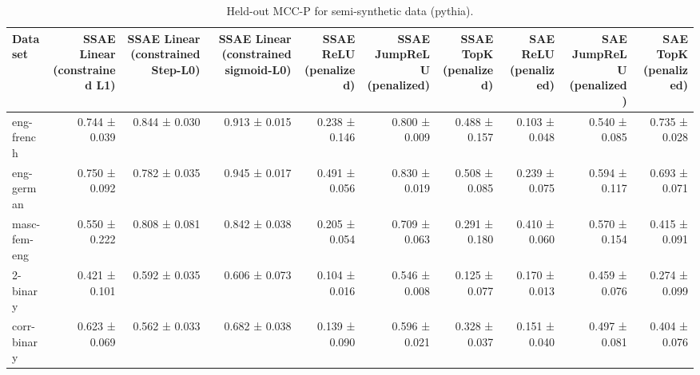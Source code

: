 \begin{table}[t]
\centering
\caption{Held-out MCC-P for semi-synthetic data (pythia).}
\label{tab:semisynthetic-pythia-mcc-p}
\begin{tabular}{lrrrrrrrrr}
\toprule
Dataset & SSAE Linear (constrained L1) & SSAE Linear (constrained Step-L0) & SSAE Linear (constrained sigmoid-L0) & SSAE ReLU (penalized) & SSAE JumpReLU (penalized) & SSAE TopK (penalized) & SAE ReLU (penalized) & SAE JumpReLU (penalized) & SAE TopK (penalized) \\
\midrule
eng-french & 0.744 ± 0.039 & 0.844 ± 0.030 & 0.913 ± 0.015 & 0.238 ± 0.146 & 0.800 ± 0.009 & 0.488 ± 0.157 & 0.103 ± 0.048 & 0.540 ± 0.085 & 0.735 ± 0.028 \\
eng-german & 0.750 ± 0.092 & 0.782 ± 0.035 & 0.945 ± 0.017 & 0.491 ± 0.056 & 0.830 ± 0.019 & 0.508 ± 0.085 & 0.239 ± 0.075 & 0.594 ± 0.117 & 0.693 ± 0.071 \\
masc-fem-eng & 0.550 ± 0.222 & 0.808 ± 0.081 & 0.842 ± 0.038 & 0.205 ± 0.054 & 0.709 ± 0.063 & 0.291 ± 0.180 & 0.410 ± 0.060 & 0.570 ± 0.154 & 0.415 ± 0.091 \\
2-binary & 0.421 ± 0.101 & 0.592 ± 0.035 & 0.606 ± 0.073 & 0.104 ± 0.016 & 0.546 ± 0.008 & 0.125 ± 0.077 & 0.170 ± 0.013 & 0.459 ± 0.076 & 0.274 ± 0.099 \\
corr-binary & 0.623 ± 0.069 & 0.562 ± 0.033 & 0.682 ± 0.038 & 0.139 ± 0.090 & 0.596 ± 0.021 & 0.328 ± 0.037 & 0.151 ± 0.040 & 0.497 ± 0.081 & 0.404 ± 0.076 \\
\bottomrule
\end{tabular}
\end{table}
